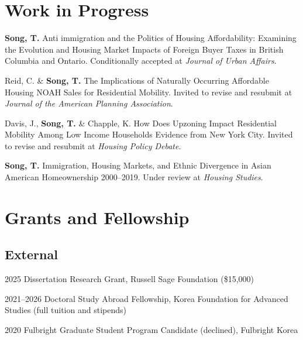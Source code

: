 \documentclass[11pt,letterpaper]{article}
\newcommand{\listitemspace}{0.25em}
\renewenvironment{itemize}
{\begin{list}{}{\setlength{\leftmargin}{1em}
\setlength{\parskip}{0em}
\setlength{\itemsep}{\listitemspace}
\setlength{\parsep}{\listitemspace}}}
{\end{list}}
\newcommand{\money}[1]{(\$#1)}  %
\newcommand{\term}[1]{(#1)}     %
\begin{document}
\section{Work in Progress}
\begin{itemize}
  \item \textbf{Song, T.} Anti immigration and the Politics of Housing Affordability: Examining the Evolution and Housing Market Impacts of Foreign Buyer Taxes in British Columbia and Ontario. Conditionally accepted at \emph{Journal of Urban Affairs}.
  \item Reid, C. \& \textbf{Song, T.} The Implications of Naturally Occurring Affordable Housing NOAH Sales for Residential Mobility. Invited to revise and resubmit at \emph{Journal of the American Planning Association}.
  \item Davis, J., \textbf{Song, T.} \& Chapple, K. How Does Upzoning Impact Residential Mobility Among Low Income Households Evidence from New York City. Invited to revise and resubmit at \emph{Housing Policy Debate}.
  \item \textbf{Song, T.} Immigration, Housing Markets, and Ethnic Divergence in Asian American Homeownership 2000–2019. Under review at \emph{Housing Studies}.
\end{itemize}

\section{Grants and Fellowship}

\subsection{External}
\begin{tablist}
  \item[2025] \tab{}Dissertation Research Grant, Russell Sage Foundation \money{15,000}
  \item[2021–2026] \tab{}Doctoral Study Abroad Fellowship, Korea Foundation for Advanced Studies \term{full tuition and stipends}
  \item[2020] \tab{}Fulbright Graduate Student Program Candidate \term{declined}, Fulbright Korea
\end{tablist}
\end{document}
